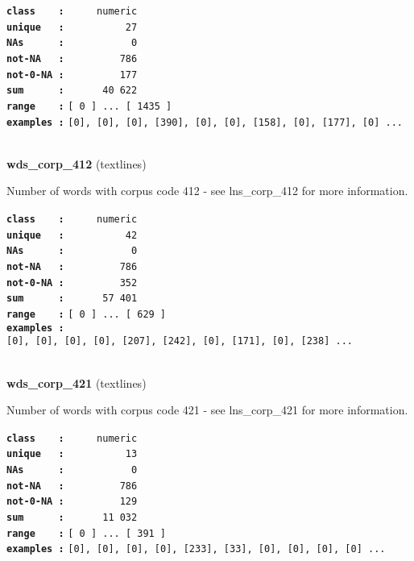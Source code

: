 \documentclass[]{article}
\begin{document}
\textbf{\texttt{class\ \ \ \ :}} \texttt{~~~~~numeric}\\
\textbf{\texttt{unique\ \ \ :}} \texttt{~~~~~~~~~~27}\\
\textbf{\texttt{NAs\ \ \ \ \ \ :}} \texttt{~~~~~~~~~~~0}\\
\textbf{\texttt{not-NA\ \ \ :}} \texttt{~~~~~~~~~786}\\
\textbf{\texttt{not-0-NA\ :}} \texttt{~~~~~~~~~177}\\
\textbf{\texttt{sum\ \ \ \ \ \ :}} \texttt{~~~~~~40~622}\\
\textbf{\texttt{range\ \ \ \ :}}
\texttt{{[}\ 0\ {]}\ ...\ {[}\ 1435\ {]}}\\
\textbf{\texttt{examples\ :}}
\texttt{{[}0{]},\ {[}0{]},\ {[}0{]},\ {[}390{]},\ {[}0{]},\ {[}0{]},\ {[}158{]},\ {[}0{]},\ {[}177{]},\ {[}0{]}\ ...}\\

~

\textbf{wds\_corp\_412} (textlines)

Number of words with corpus code 412 - see lns\_corp\_412 for more
information.

\textbf{\texttt{class\ \ \ \ :}} \texttt{~~~~~numeric}\\
\textbf{\texttt{unique\ \ \ :}} \texttt{~~~~~~~~~~42}\\
\textbf{\texttt{NAs\ \ \ \ \ \ :}} \texttt{~~~~~~~~~~~0}\\
\textbf{\texttt{not-NA\ \ \ :}} \texttt{~~~~~~~~~786}\\
\textbf{\texttt{not-0-NA\ :}} \texttt{~~~~~~~~~352}\\
\textbf{\texttt{sum\ \ \ \ \ \ :}} \texttt{~~~~~~57~401}\\
\textbf{\texttt{range\ \ \ \ :}}
\texttt{{[}\ 0\ {]}\ ...\ {[}\ 629\ {]}}\\
\textbf{\texttt{examples\ :}}
\texttt{{[}0{]},\ {[}0{]},\ {[}0{]},\ {[}0{]},\ {[}207{]},\ {[}242{]},\ {[}0{]},\ {[}171{]},\ {[}0{]},\ {[}238{]}\ ...}\\

~

\textbf{wds\_corp\_421} (textlines)

Number of words with corpus code 421 - see lns\_corp\_421 for more
information.

\textbf{\texttt{class\ \ \ \ :}} \texttt{~~~~~numeric}\\
\textbf{\texttt{unique\ \ \ :}} \texttt{~~~~~~~~~~13}\\
\textbf{\texttt{NAs\ \ \ \ \ \ :}} \texttt{~~~~~~~~~~~0}\\
\textbf{\texttt{not-NA\ \ \ :}} \texttt{~~~~~~~~~786}\\
\textbf{\texttt{not-0-NA\ :}} \texttt{~~~~~~~~~129}\\
\textbf{\texttt{sum\ \ \ \ \ \ :}} \texttt{~~~~~~11~032}\\
\textbf{\texttt{range\ \ \ \ :}}
\texttt{{[}\ 0\ {]}\ ...\ {[}\ 391\ {]}}\\
\textbf{\texttt{examples\ :}}
\texttt{{[}0{]},\ {[}0{]},\ {[}0{]},\ {[}0{]},\ {[}233{]},\ {[}33{]},\ {[}0{]},\ {[}0{]},\ {[}0{]},\ {[}0{]}\ ...}\\
\end{document}
